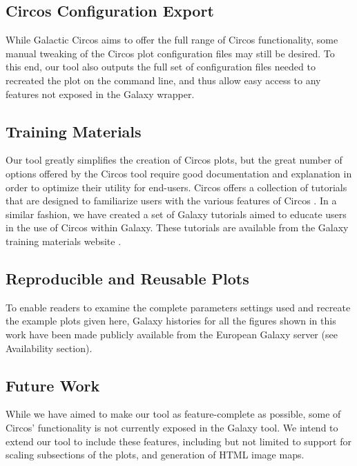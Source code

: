 \subsection*{Circos Configuration Export}
While Galactic Circos aims to offer the full range of Circos functionality, some manual tweaking of the Circos plot configuration files may still be desired. To this end, our tool also outputs the full set of configuration files needed to recreated the plot on the command line, and thus allow easy access to any features not exposed in the Galaxy wrapper.

\subsection*{Training Materials}
Our tool greatly simplifies the creation of Circos plots, but the great number of options offered by the Circos tool require good documentation and explanation in order to optimize their utility for end-users. Circos offers a collection of tutorials that are designed to familiarize users with the various features of Circos \cite{circostutorials}. In a similar fashion, we have created a set of Galaxy tutorials aimed to educate users in the use of Circos within Galaxy. These tutorials are available from the Galaxy training materials website \cite{Batut2018}.

\subsection*{Reproducible and Reusable Plots}
To enable readers to examine the complete parameters settings used and recreate the example plots given here, Galaxy histories for all the figures shown in this work have been made publicly available from the European Galaxy server \cite{TODO} (see Availability section).

\subsection*{Future Work}
While we have aimed to make our tool as feature-complete as possible, some of Circos' functionality is not currently exposed in the Galaxy tool. We intend to extend our tool to include these features, including but not limited to support for scaling subsections of the plots, and generation of HTML image maps.

